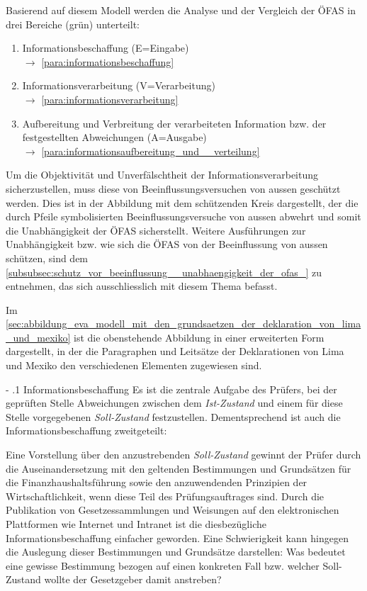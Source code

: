 \documentclass[10pt]{article}
\makeatletter
\renewcommand\paragraph{\@startsection{paragraph}{3}{0mm}{-\baselineskip}{.1\baselineskip}{\normalfont\normalsize\bfseries}}
\renewcommand\paragraph{%
\@startsection{paragraph}{3}{0mm}%
{-\baselineskip}%
{.1\baselineskip}%
{\normalfont\normalsize\bfseries}}
\makeatother
\begin{document}
Basierend auf diesem Modell werden die Analyse und der Vergleich der ÖFAS in drei Bereiche (grün) unterteilt:

\begin{enumerate}
    \item Informationsbeschaffung (E=Eingabe)\\
\hspace*{4cm}$\rightarrow$ \vref{para:informationsbeschaffung}
    \item Informationsverarbeitung (V=Verarbeitung)\\
\hspace*{4cm}$\rightarrow$ \vref{para:informationsverarbeitung}
    \item Aufbereitung und Verbreitung der verarbeiteten Information bzw. der festgestellten Abweichungen (A=Ausgabe)\\
\hspace*{4cm}$\rightarrow$ \vref{para:informationsaufbereitung_und__verteilung}
\end{enumerate}

Um die Objektivität und Unverfälschtheit der Informationsverarbeitung sicherzustellen, muss diese von Beeinflussungsversuchen von aussen geschützt werden. Dies ist in der Abbildung mit dem schützenden Kreis dargestellt, der die durch Pfeile symbolisierten Beeinflussungsversuche von aussen abwehrt und somit die Unabhängigkeit der ÖFAS sicherstellt. Weitere Ausführungen zur Unabhängigkeit bzw. wie sich die ÖFAS von der Beeinflussung von aussen schützen, sind dem \vref{subsubsec:schutz_vor_beeinflussung__unabhaengigkeit_der_ofas_} zu entnehmen, das sich ausschliesslich mit diesem Thema befasst.

Im \vref{sec:abbildung_eva_modell_mit_den_grundsaetzen_der_deklaration_von_lima_und_mexiko} ist die obenstehende Abbildung in einer erweiterten Form dargestellt, in der die Paragraphen und Leitsätze der Deklarationen von Lima und Mexiko den verschiedenen Elementen zugewiesen sind.

\paragraph{Informationsbeschaffung}\label{para:informationsbeschaffung}
Es ist die zentrale Aufgabe des Prüfers, bei der geprüften Stelle Abweichungen zwischen dem \textit{Ist-Zustand} und einem für diese Stelle vorgegebenen \textit{Soll-Zustand} festzustellen. Dementsprechend ist auch die Informationsbeschaffung zweitgeteilt: 

Eine Vorstellung über den anzustrebenden \textit{Soll-Zustand} gewinnt der Prüfer durch die Auseinandersetzung mit den geltenden Bestimmungen und Grundsätzen für die Finanzhaushaltsführung sowie den anzuwendenden Prinzipien der Wirtschaftlichkeit, wenn diese Teil des Prüfungsauftrages sind. Durch die Publikation von Gesetzessammlungen und Weisungen auf den elektronischen Plattformen wie Internet und Intranet ist die diesbezügliche Informationsbeschaffung einfacher geworden. Eine Schwierigkeit kann hingegen die Auslegung dieser Bestimmungen und Grundsätze darstellen: Was bedeutet eine gewisse Bestimmung bezogen auf einen konkreten Fall bzw. welcher Soll-Zustand wollte der Gesetzgeber damit anstreben?
\end{document}
